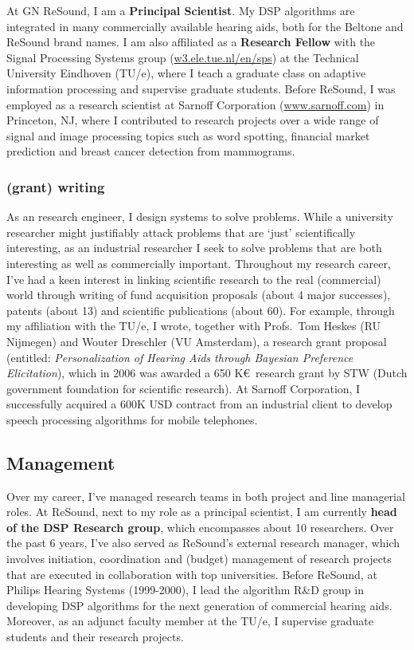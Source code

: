 \documentclass[11pt]{article}
\begin{document}
\smallskip
At GN ReSound, I am a \textbf{Principal Scientist}. My DSP algorithms are integrated in many commercially available hearing aids, both for the Beltone and ReSound brand names. I am also affiliated as a \textbf{Research Fellow} with the Signal Processing Systems group (\url{w3.ele.tue.nl/en/sps}) at the Technical University Eindhoven (TU/e), where I teach a graduate class on adaptive information processing and supervise graduate students. Before ReSound, I was employed as a research scientist at Sarnoff Corporation (\url{www.sarnoff.com}) in Princeton, NJ, where I contributed to research projects over a wide range of signal and image processing topics such as word spotting, financial market prediction and breast cancer detection from mammograms. 
   
\vspace{-5mm} 
\subsubsection{(grant) writing}
\vspace{-5mm} 
As an research engineer, I design systems to solve problems. While a university researcher might justifiably attack problems that are `just' scientifically interesting, as an industrial researcher I seek to solve problems that are both interesting as well as commercially important. Throughout my research career, I've had a keen interest in linking scientific research to the real (commercial) world through writing of fund acquisition proposals (about 4 major successes), patents (about 13)  and scientific publications (about 60).  For example, through my affiliation with the TU/e, I wrote, together with Profs.\ Tom Heskes (RU Nijmegen) and Wouter Dreschler (VU Amsterdam), a research grant proposal (entitled: \emph{Personalization of Hearing Aids through Bayesian Preference Elicitation}), which in 2006 was awarded a 650 K\euro\ research grant by STW (Dutch government foundation for scientific research). At Sarnoff Corporation, I successfully acquired a 600K USD contract from an industrial client to develop speech processing algorithms for mobile telephones. 

\subsection{Management}\vspace{-5mm}
Over my career, I've managed research teams in both project and line managerial roles.  At ReSound, next to my role as a principal scientist, I am currently \textbf{head of the DSP Research group}, which encompasses about 10 researchers. Over the past 6 years, I've also served as ReSound's external research manager, which involves initiation, coordination and (budget) management of research projects that are executed in collaboration with top universities. Before ReSound, at Philips Hearing Systems  (1999-2000), I lead the algorithm R\&D group in developing DSP algorithms for the next generation of commercial hearing aids. Moreover, as an adjunct faculty member at the TU/e, I supervise graduate students and their research projects. 
\end{document}
